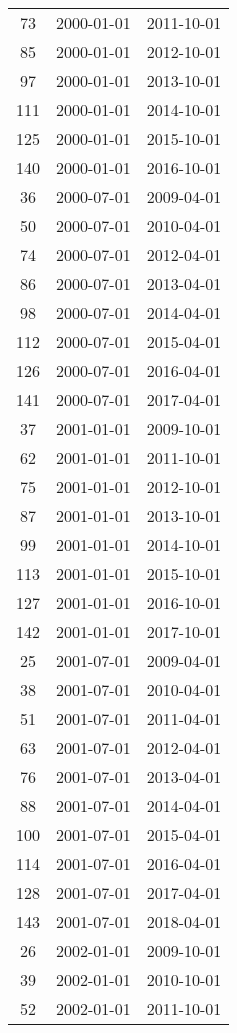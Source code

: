 \begin{tabular}{ccc}
  73 & 2000-01-01 & 2011-10-01 \\ 
  85 & 2000-01-01 & 2012-10-01 \\ 
  97 & 2000-01-01 & 2013-10-01 \\ 
  111 & 2000-01-01 & 2014-10-01 \\ 
  125 & 2000-01-01 & 2015-10-01 \\ 
  140 & 2000-01-01 & 2016-10-01 \\ 
  36 & 2000-07-01 & 2009-04-01 \\ 
  50 & 2000-07-01 & 2010-04-01 \\ 
  74 & 2000-07-01 & 2012-04-01 \\ 
  86 & 2000-07-01 & 2013-04-01 \\ 
  98 & 2000-07-01 & 2014-04-01 \\ 
  112 & 2000-07-01 & 2015-04-01 \\ 
  126 & 2000-07-01 & 2016-04-01 \\ 
  141 & 2000-07-01 & 2017-04-01 \\ 
  37 & 2001-01-01 & 2009-10-01 \\ 
  62 & 2001-01-01 & 2011-10-01 \\ 
  75 & 2001-01-01 & 2012-10-01 \\ 
  87 & 2001-01-01 & 2013-10-01 \\ 
  99 & 2001-01-01 & 2014-10-01 \\ 
  113 & 2001-01-01 & 2015-10-01 \\ 
  127 & 2001-01-01 & 2016-10-01 \\ 
  142 & 2001-01-01 & 2017-10-01 \\ 
  25 & 2001-07-01 & 2009-04-01 \\ 
  38 & 2001-07-01 & 2010-04-01 \\ 
  51 & 2001-07-01 & 2011-04-01 \\ 
  63 & 2001-07-01 & 2012-04-01 \\ 
  76 & 2001-07-01 & 2013-04-01 \\ 
  88 & 2001-07-01 & 2014-04-01 \\ 
  100 & 2001-07-01 & 2015-04-01 \\ 
  114 & 2001-07-01 & 2016-04-01 \\ 
  128 & 2001-07-01 & 2017-04-01 \\ 
  143 & 2001-07-01 & 2018-04-01 \\ 
  26 & 2002-01-01 & 2009-10-01 \\ 
  39 & 2002-01-01 & 2010-10-01 \\ 
  52 & 2002-01-01 & 2011-10-01 \\ 

\end{tabular}
